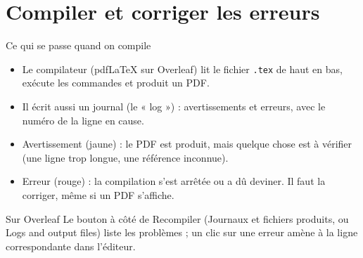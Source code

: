 \section{Compiler et corriger les erreurs}

\begin{frame}{Ce qui se passe quand on compile}
  \small
  \begin{itemize}
    \item Le compilateur (pdfLaTeX sur Overleaf) lit le fichier
      \texttt{.tex} de haut en bas, exécute les commandes et produit un
      PDF.
    \item Il écrit aussi un journal (le « log ») : avertissements et
      erreurs, avec le numéro de la ligne en cause.
    \item Avertissement (jaune) : le PDF est produit, mais quelque chose
      est à vérifier (une ligne trop longue, une référence inconnue).
    \item Erreur (rouge) : la compilation s'est arrêtée ou a dû deviner.
      Il faut la corriger, même si un PDF s'affiche.
  \end{itemize}
  \vspace{4pt}
  \begin{Rem}{Sur Overleaf}
    \small Le bouton à côté de Recompiler (Journaux et fichiers produits,
    ou Logs and output files) liste les problèmes ; un clic sur une erreur
    amène à la ligne correspondante dans l'éditeur.
  \end{Rem}
\end{frame}

